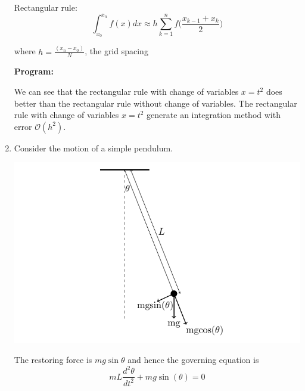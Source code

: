 \documentclass[a4paper,11pt]{report}
\begin{document}
\begin{enumerate}
    Rectangular rule:
    \begin{equation*}
    \int_{x_{0}}^{x_{n}} f(x) dx \approx h \sum_{k=1}^{n} f \Bigg(\frac{x_{k-1} + x_{k}}{2} \Bigg)
    \end{equation*}

    where $h = \displaystyle \frac{(x_{n} - x_{0})}{N}$, the grid spacing

    \vspace{1 cm}

    \textbf{Program:}
    

    \pagebreak

    \begin{figure}[ht!]
    \centering
    \resizebox{0.95\linewidth}{!}{}
    \end{figure} 

    

    We can see that the rectangular rule with change of variables $x = t^{2}$ does better than the rectangular rule without change of variables.
    The rectangular rule with change of variables $x = t^{2}$ generate an integration method with error $\mathcal{O}(h^{2})$.

    \pagebreak

    \item Consider the motion of a simple pendulum. 

    \begin{center}
    \includegraphics{pendulum.pdf}
    \end{center}

    The restoring force is $mg \sin \theta$ and hence the governing equation is
    \begin{equation*}
    mL \frac{d^{2} \theta}{dt^{2}} + mg \sin(\theta) = 0
    \end{equation*}


\end{enumerate}
\end{document}
